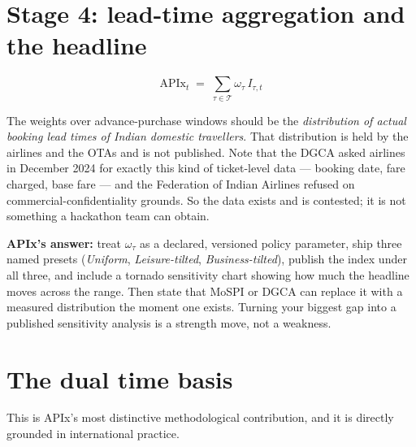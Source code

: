 \section{Stage 4: lead-time aggregation and the headline}

\begin{equation}
\boxed{\;\text{APIx}_t \;=\; \sum_{\tau\in\mathcal{T}} \omega_\tau\, I_{\tau,t}\;}
\end{equation}

\begin{warnbox}
The weights over advance-purchase windows should be the \emph{distribution of actual booking
lead times of Indian domestic travellers}. That distribution is held by the airlines and the
OTAs and is not published. Note that the DGCA asked airlines in December 2024 for exactly
this kind of ticket-level data --- booking date, fare charged, base fare --- and the
Federation of Indian Airlines refused on commercial-confidentiality grounds. So the data
exists and is contested; it is not something a hackathon team can obtain.

\textbf{APIx's answer:} treat $\omega_\tau$ as a declared, versioned policy parameter, ship
three named presets (\emph{Uniform}, \emph{Leisure-tilted}, \emph{Business-tilted}), publish
the index under all three, and include a tornado sensitivity chart showing how much the
headline moves across the range. Then state that MoSPI or DGCA can replace it with a
measured distribution the moment one exists. Turning your biggest gap into a published
sensitivity analysis is a strength move, not a weakness.
\end{warnbox}

\section{The dual time basis}
\label{sec:dual}

This is APIx's most distinctive methodological contribution, and it is directly grounded in
international practice.

